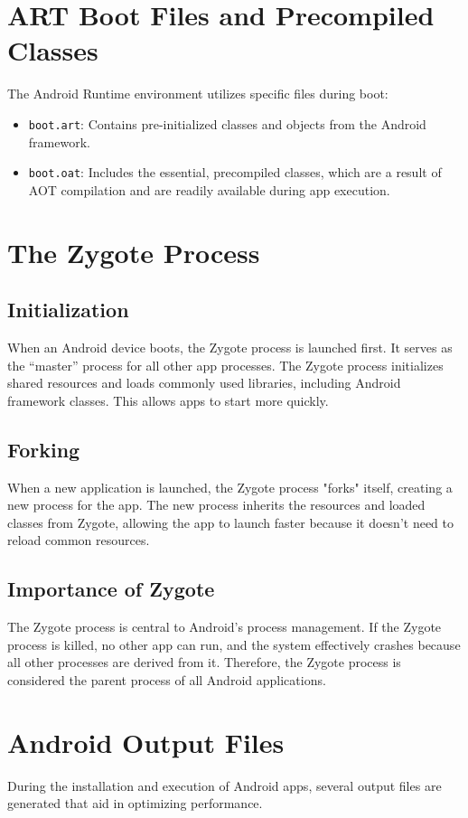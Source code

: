 \documentclass{article}
\begin{document}
\section{ART Boot Files and Precompiled Classes}
The Android Runtime environment utilizes specific files during boot:
\begin{itemize}
    \item \texttt{boot.art}: Contains pre-initialized classes and objects from the Android framework.
    \item \texttt{boot.oat}: Includes the essential, precompiled classes, which are a result of AOT compilation and are readily available during app execution.
\end{itemize}

\section{The Zygote Process}
\subsection{Initialization}
When an Android device boots, the Zygote process is launched first. It serves as the “master” process for all other app processes. The Zygote process initializes shared resources and loads commonly used libraries, including Android framework classes. This allows apps to start more quickly.

\subsection{Forking}
When a new application is launched, the Zygote process "forks" itself, creating a new process for the app. The new process inherits the resources and loaded classes from Zygote, allowing the app to launch faster because it doesn’t need to reload common resources.

\subsection{Importance of Zygote}
The Zygote process is central to Android's process management. If the Zygote process is killed, no other app can run, and the system effectively crashes because all other processes are derived from it. Therefore, the Zygote process is considered the parent process of all Android applications.

\section{Android Output Files}
During the installation and execution of Android apps, several output files are generated that aid in optimizing performance.
\end{document}
